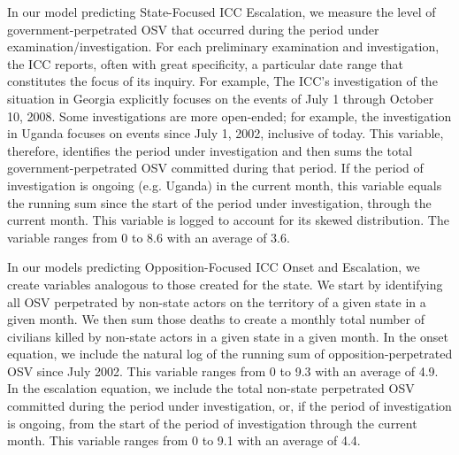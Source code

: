 In our model predicting State-Focused ICC Escalation, we measure the level of government-perpetrated OSV that occurred during the period under examination/investigation. For each preliminary examination and investigation, the ICC reports, often with great specificity, a particular date range that constitutes the focus of its inquiry. For example, The ICC's investigation of the situation in Georgia explicitly focuses on the events of July 1 through October 10, 2008. Some investigations are more open-ended; for example, the investigation in Uganda focuses on events since July 1, 2002, inclusive of today. This variable, therefore, identifies the period under investigation and then sums the total government-perpetrated OSV committed during that period. If the period of investigation is ongoing (e.g. Uganda) in the current month, this variable equals the running sum since the start of the period under investigation, through the current month. This variable is logged to account for its skewed distribution. The variable ranges from 0 to 8.6 with an average of 3.6.

In our models predicting Opposition-Focused ICC Onset and Escalation, we create variables analogous to those created for the state. We start by identifying all OSV perpetrated by non-state actors on the territory of a given state in a given month. We then sum those deaths to create a monthly total number of civilians killed by non-state actors in a given state in a given month. In the onset equation, we include the natural log of the running sum of opposition-perpetrated OSV since July 2002. This variable ranges from 0 to 9.3 with an average of 4.9. In the escalation equation, we include the total non-state perpetrated OSV committed during the period under investigation, or, if the period of investigation is ongoing, from the start of the period of investigation through the current month. This variable ranges from 0 to 9.1 with an average of 4.4.

